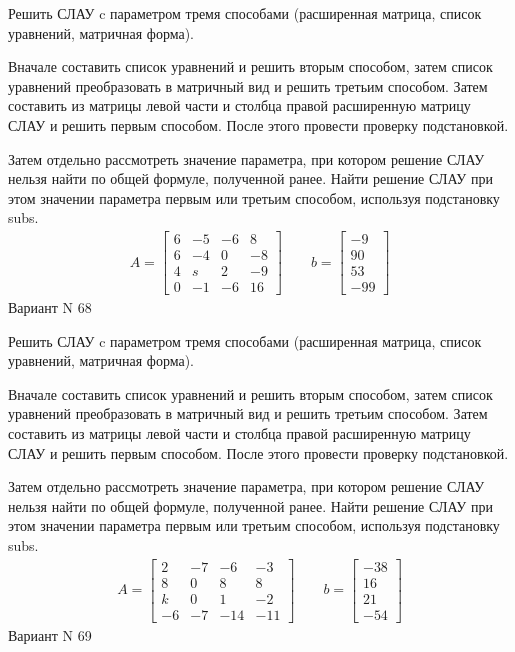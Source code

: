 \documentclass[11pt]{report}
\begin{document}
Решить СЛАУ c параметром тремя способами (расширенная матрица, список уравнений, матричная форма).

Вначале составить список уравнений и решить вторым способом,
затем список уравнений преобразовать в матричный вид и решить третьим способом.
Затем составить из матрицы левой части и столбца правой расширенную матрицу СЛАУ и решить первым способом.
После этого провести проверку подстановкой.

Затем отдельно рассмотреть значение параметра, при котором решение СЛАУ нельзя найти по общей формуле,
полученной ранее.
Найти решение СЛАУ при этом значении параметра первым или третьим способом, используя подстановку subs.
\begin{align*}
    A = \left[\begin{matrix}6 & -5 & -6 & 8\\6 & -4 & 0 & -8\\4 & s & 2 & -9\\0 & -1 & -6 & 16\end{matrix}\right]
\qquad b = \left[\begin{matrix}-9\\90\\53\\-99\end{matrix}\right]
\end{align*}
\newpage
Вариант N 68


Решить СЛАУ c параметром тремя способами (расширенная матрица, список уравнений, матричная форма).

Вначале составить список уравнений и решить вторым способом,
затем список уравнений преобразовать в матричный вид и решить третьим способом.
Затем составить из матрицы левой части и столбца правой расширенную матрицу СЛАУ и решить первым способом.
После этого провести проверку подстановкой.

Затем отдельно рассмотреть значение параметра, при котором решение СЛАУ нельзя найти по общей формуле,
полученной ранее.
Найти решение СЛАУ при этом значении параметра первым или третьим способом, используя подстановку subs.
\begin{align*}
    A = \left[\begin{matrix}2 & -7 & -6 & -3\\8 & 0 & 8 & 8\\k & 0 & 1 & -2\\-6 & -7 & -14 & -11\end{matrix}\right]
\qquad b = \left[\begin{matrix}-38\\16\\21\\-54\end{matrix}\right]
\end{align*}
\newpage
Вариант N 69
\end{document}
